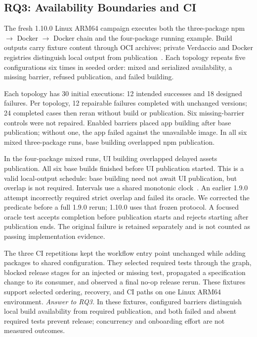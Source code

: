 \subsection{RQ3: Availability Boundaries and CI}
The fresh 1.10.0 Linux ARM64 campaign executes both the three-package
npm $\to$ Docker $\to$ Docker chain and the four-package running example.
Build outputs carry fixture content through OCI archives; private Verdaccio
and Docker registries distinguish local output from publication~\cite{oci,buildkit}.
Each topology repeats five configurations six times in seeded order: mixed and
serialized availability, a missing barrier, refused publication, and failed building.

Each topology has 30 initial executions: 12 intended successes and 18 designed
failures. Per topology, 12 repairable failures completed with unchanged versions; 24
completed cases then reran without build or publication. Six missing-barrier
controls were not repaired. Enabled barriers placed app building after base
publication; without one, the app failed against the unavailable image. In all
six mixed three-package runs, base building overlapped npm publication.

In the four-package mixed runs, UI building overlapped delayed assets
publication. All six base builds finished before UI publication started. This
is a valid local-output schedule: base building need not await UI publication,
but overlap is not required. Intervals use a shared monotonic clock~\cite{pytime}.
An earlier 1.9.0 attempt incorrectly required strict overlap and failed its
oracle. We corrected the predicate before a full 1.9.0 rerun; 1.10.0 uses that
frozen protocol. A focused oracle test accepts completion before publication
starts and rejects starting after publication ends. The original failure is
retained separately and is not counted as passing implementation evidence.

The three CI repetitions kept the workflow entry point unchanged while adding
packages to shared configuration. They selected required tests through the graph,
blocked release stages for an injected or missing test, propagated a specification
change to its consumer, and observed a final no-op release rerun. These fixtures
support selected ordering, recovery, and CI paths on one Linux ARM64 environment.
\emph{Answer to RQ3.} In these fixtures, configured barriers distinguish local
build availability from required publication, and both failed and absent
required tests prevent release; concurrency and onboarding effort are not
measured outcomes.
